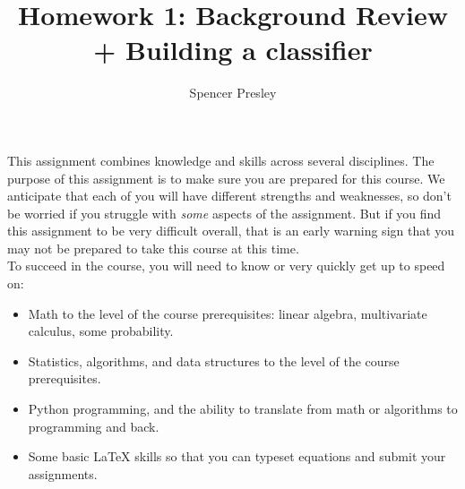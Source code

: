 \documentclass{article}
\title{Homework 1: Background Review + Building a classifier}
\author{Spencer Presley} %
\begin{document}



\maketitle

This assignment combines knowledge and skills across several disciplines. 
The purpose of this assignment is to make sure you are prepared for this course. We anticipate that each
of you will have different strengths and weaknesses, so don't be worried if you struggle with \emph{some} aspects
of the assignment. But if you find this assignment to be very difficult overall, that is an early warning sign that you may not be prepared to take this course at this time. \\ 

To succeed in the course, you will need to know or very quickly get up to speed on:
\begin{itemize}
\item Math to the level of the course prerequisites: linear algebra, multivariate calculus, some probability.
\item Statistics, algorithms, and data structures to the level of the course prerequisites.
\item Python programming, and the ability to translate from math or algorithms to programming and back.
\item Some basic LaTeX skills so that you can typeset equations and submit your assignments.
\end{itemize}



\vspace{0.5cm}
\end{document}

